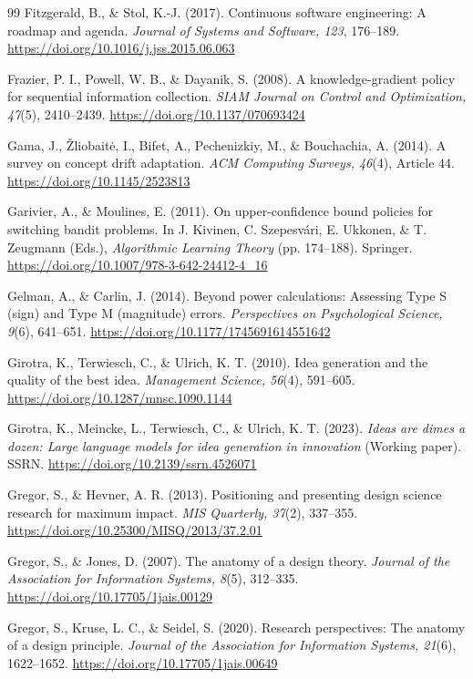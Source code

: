 \documentclass[preprint,12pt,authoryear]{elsarticle}
\providecommand{\doi}[1]{\url{https://doi.org/#1}}
\theoremstyle{definition}
\begin{document}
\begin{thebibliography}{99}
 Fitzgerald, B., \& Stol, K.-J. (2017). Continuous software engineering: A roadmap and agenda. \textit{Journal of Systems and Software, 123}, 176--189. \doi{10.1016/j.jss.2015.06.063}

 Frazier, P. I., Powell, W. B., \& Dayanik, S. (2008). A knowledge-gradient policy for sequential information collection. \textit{SIAM Journal on Control and Optimization, 47}(5), 2410--2439. \doi{10.1137/070693424}

 Gama, J., {\v{Z}}liobait{\.e}, I., Bifet, A., Pechenizkiy, M., \& Bouchachia, A. (2014). A survey on concept drift adaptation. \textit{ACM Computing Surveys, 46}(4), Article 44. \doi{10.1145/2523813}

 Garivier, A., \& Moulines, E. (2011). On upper-confidence bound policies for switching bandit problems. In J. Kivinen, C. Szepesv{\'a}ri, E. Ukkonen, \& T. Zeugmann (Eds.), \textit{Algorithmic Learning Theory} (pp. 174--188). Springer. \doi{10.1007/978-3-642-24412-4_16}

 Gelman, A., \& Carlin, J. (2014). Beyond power calculations: Assessing Type S (sign) and Type M (magnitude) errors. \textit{Perspectives on Psychological Science, 9}(6), 641--651. \doi{10.1177/1745691614551642}

 Girotra, K., Terwiesch, C., \& Ulrich, K. T. (2010). Idea generation and the quality of the best idea. \textit{Management Science, 56}(4), 591--605. \doi{10.1287/mnsc.1090.1144}

 Girotra, K., Meincke, L., Terwiesch, C., \& Ulrich, K. T. (2023). \textit{Ideas are dimes a dozen: Large language models for idea generation in innovation} (Working paper). SSRN. \doi{10.2139/ssrn.4526071}

 Gregor, S., \& Hevner, A. R. (2013). Positioning and presenting design science research for maximum impact. \textit{MIS Quarterly, 37}(2), 337--355. \doi{10.25300/MISQ/2013/37.2.01}

 Gregor, S., \& Jones, D. (2007). The anatomy of a design theory. \textit{Journal of the Association for Information Systems, 8}(5), 312--335. \doi{10.17705/1jais.00129}

 Gregor, S., Kruse, L. C., \& Seidel, S. (2020). Research perspectives: The anatomy of a design principle. \textit{Journal of the Association for Information Systems, 21}(6), 1622--1652. \doi{10.17705/1jais.00649}


\end{thebibliography}
\end{document}
